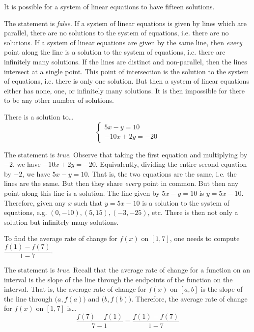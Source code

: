 \documentclass[11pt,letterpaper]{article}
\begin{document}
 It is possible for a system of linear equations to have fifteen solutions. \pspace

\sol The statement is \textit{false}. If a system of linear equations is given by lines which are parallel, there are no solutions to the system of equations, i.e. there are no solutions. If a system of linear equations are given by the same line, then \textit{every} point along the line is a solution to the system of equations, i.e. there are infinitely many solutions. If the lines are distinct and non-parallel, then the lines intersect at a single point. This point of intersection is the solution to the system of equations, i.e. there is only one solution. But then a system of linear equations either has none, one, or infinitely many solutions. It is then impossible for there to be any other number of solutions. \pvspace{1.3cm}



 There is a solution to\dots
	\[
	\begin{cases}
	5x - y= 10 \\
	-10x + 2y= -20
	\end{cases}
	\] \pspace

\sol The statement is \textit{true}. Observe that taking the first equation and multiplying by $-2$, we have $-10x + 2y= -20$. Equivalently, dividing the entire second equation by $-2$, we have $5x - y= 10$. That is, the two equations are the same, i.e. the lines are the same. But then they share \textit{every} point in common. But then any point along this line is a solution. The line given by $5x - y= 10$ is $y= 5x - 10$. Therefore, given any $x$ such that $y= 5x - 10$ is a solution to the system of equations, e.g. $(0, -10), (5, 15), (-3, -25)$, etc. There is then not only a solution but infinitely many solutions. \pvspace{1.3cm}



 To find the average rate of change for $f(x)$ on $[1, 7]$, one needs to compute $\dfrac{f(1) - f(7)}{1 - 7}$. \pspace

\sol The statement is \textit{true}. Recall that the average rate of change for a function on an interval is the slope of the line through the endpoints of the function on the interval. That is, the average rate of change for $f(x)$ on $[a, b]$ is the slope of the line through $\big(a, f(a) \big)$ and $\big(b, f(b) \big)$. Therefore, the average rate of change for $f(x)$ on $[1, 7]$ is\dots
	\[
	\dfrac{f(7) - f(1)}{7 - 1}= \dfrac{f(1) - f(7)}{1 - 7}
	\]
\end{document}
